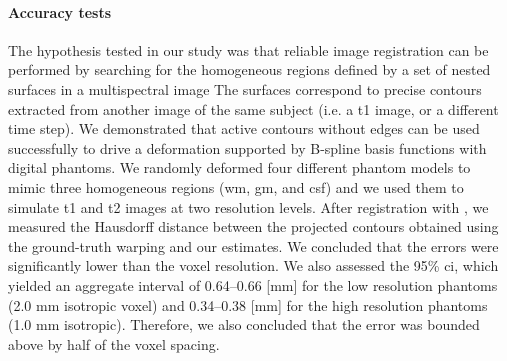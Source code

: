 \paragraph*{Accuracy tests}
The hypothesis tested in our study was that reliable image registration can be performed
  by searching for the homogeneous regions defined by a set of nested surfaces in a
  multispectral image
The surfaces correspond to precise contours extracted from another image of the same subject
  (i.e. a \gls*{t1} image, or a different time step).
We demonstrated that active contours without edges can be used successfully to drive a
  deformation supported by B-spline basis functions with digital phantoms.
We randomly deformed four different phantom models to mimic three homogeneous regions
  (\gls*{wm}, \gls*{gm}, and \acrlong*{csf}) and we used them to simulate \gls*{t1} and \gls*{t2}
  images at two resolution levels.
After registration with \regseg{}, we measured the Hausdorff distance between the
  projected contours obtained using the ground-truth warping and our estimates.
We concluded that the errors were significantly lower than the voxel resolution.
We also assessed the 95\% \gls*{ci}, which yielded an aggregate interval of
  0.64--0.66 [mm] for the low resolution phantoms (2.0 mm isotropic voxel) and
  0.34--0.38 [mm] for the high resolution phantoms (1.0 mm isotropic).
Therefore, we also concluded that the error was bounded above by half of the
  voxel spacing.
\newcomment[RV\#1(C.8)]{%
The distributions of errors along surfaces vary importantly depending on the shape of the
  phantom (see \autoref{fig:regseg-phantom}B).
The misregistration error of the ``gyrus'' phantom showed a much lower spread than that
  for the other shapes.
We argue that the symmetry of those other shapes posed difficulties in driving the contours
  towards the appropriate region and producing some ``sliding'' effect between the
  faces of the surfaces and their ground-truth position.
This effect should not be present in real datasets, thanks to the very convoluted cortical
  layer, and the directional restriction of distortion.}

